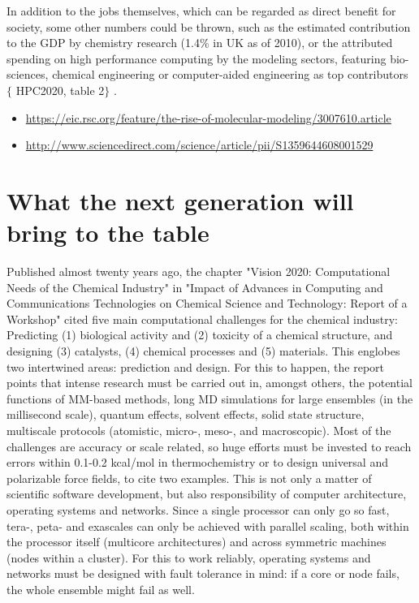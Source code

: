 In addition to the jobs themselves, which can be regarded as direct benefit for society, some other numbers could be thrown, such as the estimated contribution to the GDP by chemistry research (1.4$\%$  in UK as of 2010\cite{UKeconomics}), or the attributed spending on high performance computing by the modeling sectors, featuring bio-sciences, chemical engineering or computer-aided engineering as top contributors $ \{ $ HPC2020, table 2$ \} $ .

\begin{itemize}
	\item \href{https://eic.rsc.org/feature/the-rise-of-molecular-modeling/3007610.article}{https://eic.rsc.org/feature/the-rise-of-molecular-modeling/3007610.article}

	\item \href{http://www.sciencedirect.com/science/article/pii/S1359644608001529}{http://www.sciencedirect.com/science/article/pii/S1359644608001529}
\end{itemize}

\section*{What the next generation will bring to the table}

Published almost twenty years ago, the chapter "Vision 2020: Computational Needs of the Chemical Industry" in "Impact of Advances in Computing and Communications Technologies on Chemical Science and Technology: Report of a Workshop" cited five main computational challenges for the chemical industry: Predicting (1) biological activity and (2) toxicity of a chemical structure, and designing (3) catalysts, (4) chemical processes and (5) materials. This englobes two intertwined areas: prediction and design. For this to happen, the report points that intense research must be carried out in, amongst others, the potential functions of MM-based methods, long MD simulations for large ensembles (in the millisecond scale), quantum effects, solvent effects, solid state structure, multiscale protocols (atomistic, micro-, meso-, and macroscopic). Most of the challenges are accuracy or scale related, so huge efforts must be invested to reach errors within 0.1-0.2 kcal/mol in thermochemistry or to design universal and polarizable force fields, to cite two examples. This is not only a matter of scientific software development, but also responsibility of computer architecture, operating systems and networks. Since a single processor can only go so fast, tera-, peta- and exascales can only be achieved with parallel scaling, both within the processor itself (multicore architectures) and across symmetric machines (nodes within a cluster). For this to work reliably, operating systems and networks must be designed with fault tolerance in mind: if a core or node fails, the whole ensemble might fail as well.\cite{vision2020}

